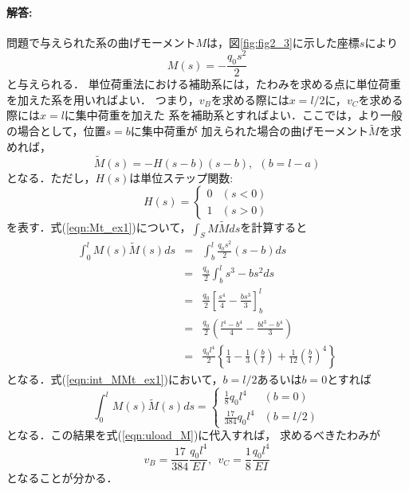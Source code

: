 \documentclass[10pt,a4j]{jarticle}
\begin{document}
\paragraph{解答:}
問題で与えられた系の曲げモーメント$M$は，図\ref{fig:fig2_3}に示した座標$s$により
\begin{equation}
	M(s)=-\frac{q_0s^2}{2}
	\label{eqn:}
\end{equation}
と与えられる．
単位荷重法における補助系には，たわみを求める点に単位荷重を加えた系を用いればよい．
つまり，$v_B$を求める際には$x=l/2$に，$v_C$を求める際には$x=l$に集中荷重を加えた
系を補助系とすればよい．ここでは，より一般の場合として，位置$s=b$に集中荷重が
加えられた場合の曲げモーメント$\tilde M$を求めれば，
\begin{equation}
	\tilde M(s) = -H(s-b)(s-b), \ \ (b=l-a)
	\label{eqn:Mt_ex1}
\end{equation}
となる．ただし，$H(s)$は単位ステップ関数:
\begin{equation}
	H(s)=
	\left\{
	\begin{array}{cc}
		0 &  (s<0) \\
		1 & ( s>0)
	\end{array}
	\right.
	\label{eqn:}
\end{equation}
を表す．式(\ref{eqn:Mt_ex1})について，$\int_SM\tilde Mds$を計算すると
\begin{eqnarray}
	\int_0^l M(s)\tilde M(s) ds
	&=&
	\int_b^l\frac{q_0s^2}{2}(s-b)ds \\
	&=&
	\frac{q_0}{2}\int_b^ls^3-bs^2ds \\
	&=&
	\frac{q_0}{2}\left[
		\frac{s^4}{4}-\frac{bs^3}{3}
		\right]_b^l \\
	&=&
	\frac{q_0}{2}
	\left(
	\frac{l^4-b^4}{4}-\frac{bl^3-b^4}{3}
	\right)
	\\
	&=&
	\frac{q_0l^4}{2}\left\{
		\frac{1}{4}
		-\frac{1}{3}
		\left(\frac{b}{l}\right)
		+
		\frac{1}{12}
		\left(\frac{b}{l}\right)^4
	\right\}
	\label{eqn:int_MMt_ex1}
\end{eqnarray}
となる．式(\ref{eqn:int_MMt_ex1})において，$b=l/2$あるいは$b=0$とすれば
\begin{equation}
	\int_0^l M(s)\tilde M(s) ds =
	\left\{
	\begin{array}{cc}
		\frac{1}{8}q_0l^4& (b=0)  \\
		\frac{17}{384}q_0l^4& (b=l/2)  
	\end{array}
	\right.
	\label{eqn:}
\end{equation}
となる．この結果を式(\ref{eqn:uload_M})に代入すれば，
求めるべきたわみが
\begin{equation}
	v_B= \frac{17}{384}\frac{q_0l^4}{EI}
	, \ \ 
	v_C= \frac{1}{8}\frac{q_0l^4}{EI}
	\label{eqn:}
\end{equation}
となることが分かる．
\end{document}
